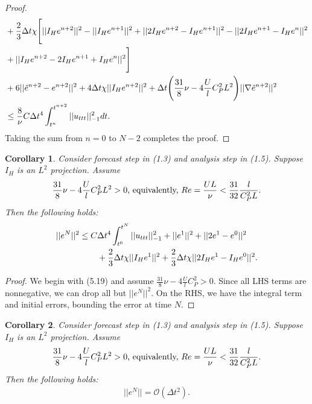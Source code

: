 \documentclass[10pt,a4paper]{amsart}
\newtheorem{corollary}{Corollary}[theorem]
\begin{document}
\begin{proof}
\begin{align}
        &+\frac{2}{3}\Delta t\chi \Bigg[ ||I_He^{n+2}||^2 - ||I_He^{n+1}||^2 + ||2I_He^{n+2}-I_He^{n+1}||^2 - ||2I_He^{n+1}-I_He^n||^2 \notag \\
        &+||I_He^{n+2}-2I_He^{n+1}+I_He^n||^2\Bigg]  \\
        &+6||\Tilde{e}^{n+2}-e^{n+2}||^2 +4\Delta t\chi ||I_He^{n+2}||^2 +\Delta t\Bigg(\frac{31}{8}\nu -4\frac{U}{l}C_P^2L^2\Bigg) ||\nabla \Tilde{e}^{n+2}||^2 \notag \\
        &\leq \frac{8}{\nu}C\Delta t^4\int_{t^n}^{t^{n+2}}||u_{ttt}||_{-1}^2dt. \notag
    \end{align}
    Taking the sum from $n = 0$ to $N-2$
    completes the proof.
\end{proof}

\begin{corollary}
    Consider forecast step in (1.3) and analysis step in (1.5). Suppose $I_H$ is an $L^2$ projection. Assume 
    \begin{align}
        \frac{31}{8}\nu-4\frac{U}{l}C_P^2L^2>0  \text{, equivalently, } Re=\frac{UL}{\nu}<\frac{31}{32}\frac{l}{C_P^2L}. \notag
    \end{align} Then the following holds:
    \begin{align}
        ||e^N||^2\leq C&\Delta t^4\int_{t^0}^{t^{N}}||u_{ttt}||_{-1}^2 + ||e^1||^2+||2e^1-e^0||^2 \notag \\
        &+\frac{2}{3}\Delta t\chi ||I_He^1||^2+\frac{2}{3}\Delta t\chi ||2I_He^1-I_He^0||^2.
    \end{align}
\end{corollary}

\begin{proof}
    We begin with (5.19) and assume $\frac{31}{8}\nu-4\frac{U}{l}C_P^2>0$. Since all LHS terms are nonnegative, we can drop all but $||e^N||^2$. On the RHS, we have the integral term and initial errors, bounding the error at time $N$.
\end{proof}

\begin{corollary}
    Consider forecast step in (1.3) and analysis step in (1.5). Suppose $I_H$ is an $L^2$ projection. Assume 
    \begin{align}
        \frac{31}{8}\nu-4\frac{U}{l}C_P^2L^2>0 \text{, equivalently, } Re=\frac{UL}{\nu}<\frac{31}{32}\frac{l}{C_P^2L}. \notag
    \end{align} Then the following holds:
    \begin{align}
        ||e^N||=\mathcal{O}(\Delta t^2).
    \end{align}
\end{corollary}
\end{document}
